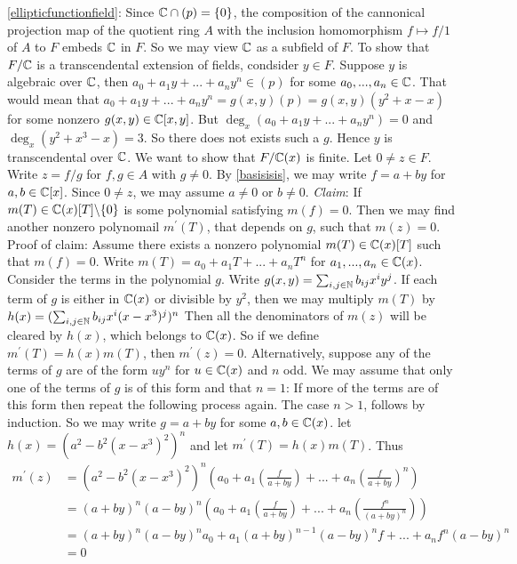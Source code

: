 \begin{solution}
\eqref{ellipticfunctionfield}: Since $\mathbb{C} \cap (p) = \lbrace 0 \rbrace $, 
the composition of the cannonical projection map
of the quotient ring $A$ with the inclusion homomorphism $f \mapsto f/1 $ of 
$A$ to $F$ embeds $\mathbb{C} $ in $F$. So we may view $\mathbb{C} $ as a subfield of
$F$. To show that $F/ \mathbb{C}$ is a transcendental extension of 
fields, condsider $y\in F$. Suppose $y$ is algebraic over 
$\mathbb{C} $, then $a_0 + a_1y + ... + a_ny^n \in (p)$ 
for some $a_0,...,a_n \in \mathbb{C}$. That would mean 
that $a_0 + a_1y + ... + a_ny^n = g(x,y)(p) = g(x,y)(y^2 + x - x)$ 
for some nonzero $g(x,y) \in \mathbb{C}[x,y]$.
But $\deg_x(a_0 + a_1y + ... + a_ny^n) = 0$ and 
$\deg_x (y^2 +x^3 -x) = 3$. So there does not exists such a $g$.
Hence $y$ is transcendental over $\mathbb{C}$.
We want to show that $F/\mathbb{C}(x)$ is finite.
Let $0 \neq z \in F$. Write $z = f/g$ for $f,g\in A$ with $g \neq 0$.
By \eqref{basisisis}, we may write $f = a + by$ for 
$a,b \in \mathbb{C}[x]$. 
Since $0 \neq z$, we may assume $a\neq 0$ or  $b \neq 0$. 
\textit{Claim}: If $m(T) \in \mathbb{C}(x) [T] \backslash \lbrace 0 \rbrace$ is 
some polynomial satisfying $m(f) = 0$. Then we may find another 
nonzero polynomail $m^{\prime}(T)$, that depends on $g$, such 
that $m(z) = 0$. \\

Proof of claim:
Assume there exists a nonzero polynomial $m(T) \in \mathbb{C}(x)[T]$ 
such that $m(f) = 0$. Write $m(T) = a_0 + a_1T + ... + a_nT^n$ 
for $a_1,...,a_n \in \mathbb{C}(x)$. Consider the terms in the polynomial $g$.
Write $g(x,y) = \sum_{i,j\in \mathbb{N} } b_{ij} x^iy^j$. 
If each term of $g$ is either in $\mathbb{C}(x)$ or divisible by $y^2$,
then we may multiply $m(T)$ by $h(x) = (\sum_{i,j\in \mathbb{N} } b_{ij} x^i(x-x^3)^j)^n$
Then all the denominators of $m(z)$ will be cleared by $h(x)$, which 
belongs to $\mathbb{C}(x)$. So if we define $m^{\prime}(T) = h(x)m(T)$,
then $m^{\prime} (z) = 0$. Alternatively, suppose any of the terms
of $g$ are of the form $uy^n$ for $u\in \mathbb{C}(x)$ and $n$ odd.
We may assume that only one of the terms of $g$ is of this form 
and that $n = 1$: If more of the terms are of this form then 
repeat the following process again. 
The case $n > 1 $, follows by induction. So we may write
$g = a + by$ for some $a,b \in \mathbb{C}(x)$. let $h(x) = (a^2 - b^2(x-x^3)^2)^n$ and 
let $m^{\prime}(T) = h(x)m(T)$. 
Thus
\begin{align*}
m^{\prime}(z) &= (a^2 - b^2(x-x^3)^2)^n(a_0 + a_1(\frac{f}{a+by}) + ... + a_n(\frac{f}{a+by})^n) \\
&= (a+by)^n(a-by)^n (a_0 + a_1(\frac{f}{a+by}) + ... + a_n(\frac{f^n}{(a+by)^n})) \\
&= (a+by)^n(a-by)^na_0 + a_1(a+by)^{n-1}(a-by)^nf + ... + a_nf^n(a-by)^n \\
&= 0  
\end{align*}


\end{solution}
